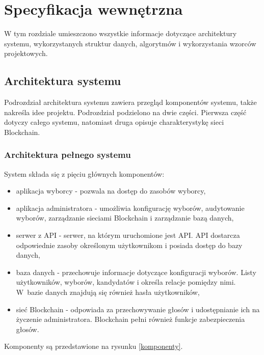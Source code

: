 \documentclass[a4paper,12pt]{book}
\begin{document}

\chapter{Specyfikacja wewnętrzna}

W tym rozdziale umieszczono wszystkie informacje dotyczące architektury systemu, wykorzystanych struktur danych, algorytmów i wykorzystania wzorców projektowych.
 
\section{Architektura systemu}
Podrozdział architektura systemu zawiera przegląd komponentów systemu, także nakreśla idee projektu. Podrozdział podzielono na dwie części. Pierwsza część dotyczy całego systemu, natomiast druga opisuje charakterystykę sieci Blockchain.
 
\subsection{Architektura pełnego systemu}
 
System składa się z pięciu głównych komponentów:

\begin {itemize}
	\item aplikacja wyborcy - pozwala na dostęp do zasobów wyborcy,
	\item aplikacja administratora - umożliwia konfigurację wyborów, audytowanie wyborów, zarządzanie sieciami Blockchain i zarządzanie bazą danych,
	\item serwer z API - serwer, na którym uruchomione jest API. API dostarcza odpowiednie zasoby określonym użytkownikom i posiada dostęp do bazy danych,
	\item baza danych - przechowuje informacje dotyczące konfiguracji wyborów. Listy użytkowników, wyborów, kandydatów i określa relacje pomiędzy nimi. W~bazie danych znajdują się również hasła użytkowników,
	\item sieć Blockchain - odpowiada za przechowywanie głosów i udostępnianie ich na życzenie administratora. Blockchain pełni również funkcje zabezpieczenia głosów.
\end {itemize}

Komponenty są przedstawione na rysunku \ref{komponenty}.
\end{document}
